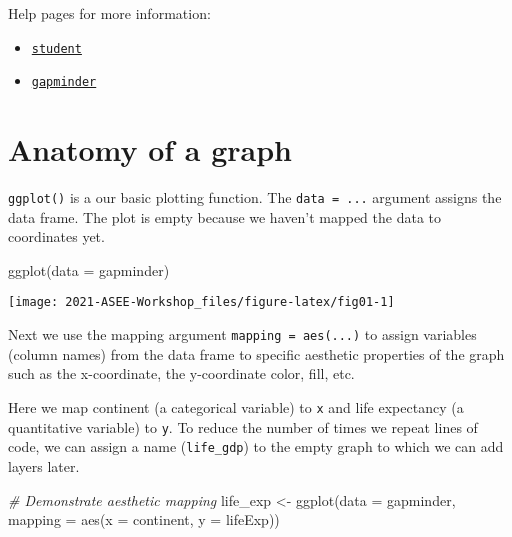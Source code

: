 \documentclass[
]{book}
\newenvironment{Shaded}{\begin{snugshade}}{\end{snugshade}}
\newcommand{\AttributeTok}[1]{\textcolor[rgb]{0.77,0.63,0.00}{#1}}
\newcommand{\CommentTok}[1]{\textcolor[rgb]{0.56,0.35,0.01}{\textit{#1}}}
\newcommand{\FunctionTok}[1]{\textcolor[rgb]{0.00,0.00,0.00}{#1}}
\newcommand{\NormalTok}[1]{#1}
\newcommand{\OtherTok}[1]{\textcolor[rgb]{0.56,0.35,0.01}{#1}}
\providecommand{\tightlist}{%
  \setlength{\itemsep}{0pt}\setlength{\parskip}{0pt}}
\begin{document}
Help pages for more information:

\begin{itemize}
\tightlist
\item
  \href{https://midfieldr.github.io/midfielddata/reference/student.html}{\texttt{student}}
\item
  \href{https://www.rdocumentation.org/packages/gapminder/versions/0.3.0/topics/gapminder}{\texttt{gapminder}}
\end{itemize}

\hypertarget{anatomy-of-a-graph}{%
\section{Anatomy of a graph}\label{anatomy-of-a-graph}}

\texttt{ggplot()} is a our basic plotting function. The \texttt{data\ =\ ...} argument assigns the data frame. The plot is empty because we haven't mapped the data to coordinates yet.

\begin{Shaded}
\begin{Highlighting}[]
\FunctionTok{ggplot}\NormalTok{(}\AttributeTok{data =}\NormalTok{ gapminder)}
\end{Highlighting}
\end{Shaded}

\texttt{[image: 2021-ASEE-Workshop\_files/figure-latex/fig01-1]}

Next we use the mapping argument \texttt{mapping\ =\ aes(...)} to assign variables (column names) from the data frame to specific aesthetic properties of the graph such as the x-coordinate, the y-coordinate color, fill, etc.

Here we map continent (a categorical variable) to \texttt{x} and life expectancy (a quantitative variable) to \texttt{y}. To reduce the number of times we repeat lines of code, we can assign a name (\texttt{life\_gdp}) to the empty graph to which we can add layers later.

\begin{Shaded}
\begin{Highlighting}[]
\CommentTok{\# Demonstrate aesthetic mapping}
\NormalTok{life\_exp }\OtherTok{\textless{}{-}} \FunctionTok{ggplot}\NormalTok{(}\AttributeTok{data =}\NormalTok{ gapminder, }\AttributeTok{mapping =} \FunctionTok{aes}\NormalTok{(}\AttributeTok{x =}\NormalTok{ continent, }\AttributeTok{y =}\NormalTok{ lifeExp))}
\end{Highlighting}
\end{Shaded}
\end{document}
